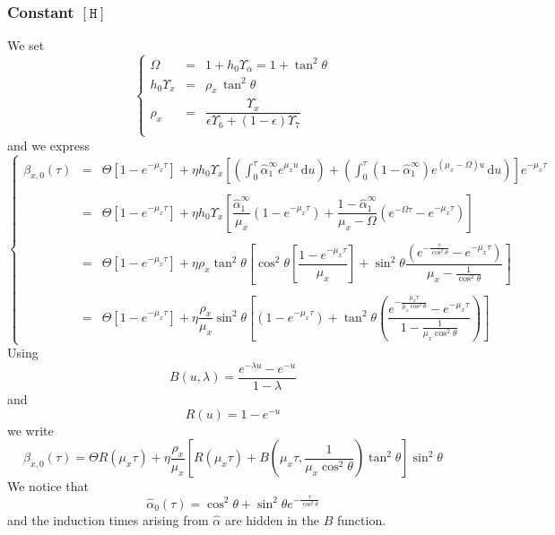 \documentclass[aps,onecolumn,12pt]{revtex4}
\newcommand{\mychem}[1]{\mathtt{#1}}
\newcommand{\myconc}[1]{\left\lbrack{#1}\right\rbrack}
\newcommand{\spproton}{\mychem{H}}
\newcommand{\proton}{\myconc{\spproton}}
\begin{document}
\subsubsection{Constant $\proton$}
We set
\begin{equation}
\left\lbrace
\begin{array}{rcl}
	\Omega & = & 1 + h_0 \Upsilon_\alpha = 1 + \tan^2 \theta\\
	h_0 \Upsilon_x & = & \rho_x \, \tan^2\theta\\
	\rho_x & = & \dfrac{\Upsilon_x}{\epsilon\Upsilon_6+(1-\epsilon)\Upsilon_7}\\
\end{array}
\right.
\end{equation}
and we express
\begin{equation}
\left\lbrace
\begin{array}{rcl}
	\beta_{x,0}(\tau) & = & \displaystyle \Theta \left[ 1-e^{-\mu_x \tau}\right] + \eta h_0 \Upsilon_x
	\left[ 
	\left(
	\int_0^\tau 
	\hat\alpha_1^\infty e^{\mu_x u}
	\, \mathrm{d} u
	\right)
	+
	\left(
	\int_0^\tau \left(1-\hat\alpha_1^\infty\right) e^{(\mu_x-\Omega) u} \, \mathrm{d} u
	\right)
	\right] e^{-\mu_x \tau} \\
	\\
	& = & \displaystyle \Theta \left[ 1-e^{-\mu_x \tau}\right] + \eta h_0 \Upsilon_x \left[
	\dfrac{\hat\alpha_1^\infty}{\mu_x}\left(1-e^{-\mu_x \tau}\right)
	+\dfrac{1-\hat\alpha_1^\infty}{\mu_x-\Omega}\left(e^{-\Omega\tau}-e^{-\mu_x\tau}\right)
	\right]\\\\
	& = & \displaystyle \Theta \left[ 1-e^{-\mu_x \tau}\right] + \eta \rho_x \tan^2\theta \left[
	\cos^2\theta \left[\dfrac{1-e^{-\mu_x \tau}}{\mu_x}\right]
	+\sin^2\theta\dfrac{\left(e^{-\frac{\tau}{\cos^2\theta}}-e^{-\mu_x\tau}\right)}{\mu_x-\frac{1}{\cos^2\theta}}
	\right]\\
	\\
	& = & \displaystyle \Theta \left[ 1-e^{-\mu_x \tau}\right] + \eta \dfrac{\rho_x}{\mu_x} \sin^2\theta 
	\left[
	\left({1-e^{-\mu_x \tau}}\right) + \tan^2\theta
	\left(
	 \dfrac{e^{-\frac{\mu_x\tau}{\mu_x\cos^2\theta}}-e^{-\mu_x\tau}}{1-\frac{1}{\mu_x\cos^2\theta}}
	 \right)
	\right]
	\end{array}
\right.
\end{equation}
Using 
\begin{equation}
	B(u,\lambda) = \dfrac{e^{-\lambda u}-e^{-u}}{1-\lambda}
\end{equation}
and
\begin{equation}
	R(u) = 1-e^{-u}
\end{equation}
we write
\begin{equation}
		\beta_{x,0}(\tau) = \Theta R(\mu_x\tau) + \eta \dfrac{\rho_x}{\mu_x}  \left[ R(\mu_x\tau) +  B\left(\mu_x\tau,\frac{1}{\mu_x\cos^2\theta}\right)\tan^2\theta\right]\sin^2\theta
\end{equation}
We notice that
\begin{equation}
	\hat\alpha_0(\tau) = \cos^2\theta + \sin^2\theta e^{-\frac{\tau}{\cos^2\theta}}
\end{equation}
and the induction times arising from $\hat\alpha$ are hidden in the $B$ function.
\end{document}
